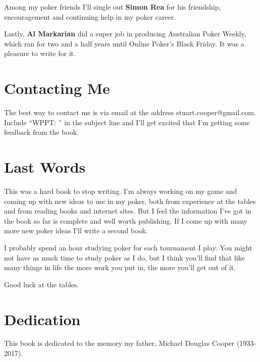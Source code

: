 Among my poker friends I'll single out \textbf{Simon Rea} for his friendship,
encouragement and continuing help in my poker career.

Lastly, \textbf{Al Markarian} did a super job in producing Australian
Poker Weekly, which ran for two and a half years until Online Poker's
Black Friday. It was a pleasure to write for it.

\section*{Contacting Me}

The best way to contact me is via email at the address
stuart.cooper@gmail.com. Include ``WPPT: '' in the subject
line and I'll get excited that I'm getting some feedback from
the book.

\section*{Last Words}

This was a hard book to stop writing. I'm always working on my game
and coming up with new ideas to use in my poker, both from experience
at the tables and from reading books and internet sites. But I feel the
information I've got in the book so far is complete and well worth
publishing. If I come up with many more new poker ideas I'll write
a second book.

I probably spend an hour studying poker for each tournament I play.
You might not have as much time to study poker as I do, but I think you'll
find that like many things in life the more work you put in, the
more you'll get out of it.

Good luck at the tables.

\section*{Dedication}

This book is dedicated to the memory my father,
Michael Douglas Cooper (1933-2017).







